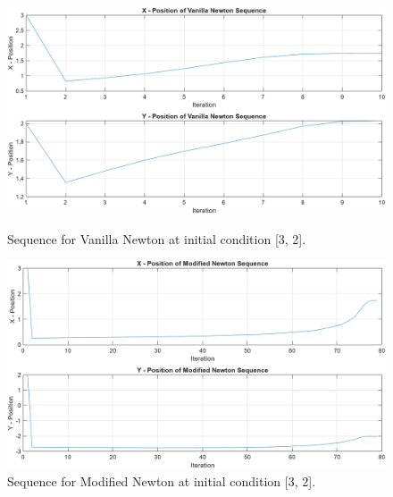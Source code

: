 \newpage
\begin{figure}[!htb]
  \centering
  \begin{minipage}{0.45\textwidth}
    \centering
    \includegraphics[width=\linewidth]{Images/Fenton_32_VN.png}
    \caption{Sequence for Vanilla Newton at initial condition [3, 2].}
    \label{fig:VN4}
  \end{minipage}\hfill
  \begin{minipage}{0.45\textwidth}
    \centering
    \includegraphics[width=\linewidth]{Images/Fenton_32_NMHM.png}
    \caption{Sequence for Modified Newton at initial condition [3, 2].}
    \label{fig:NMHM4}
  \end{minipage}
\end{figure}

